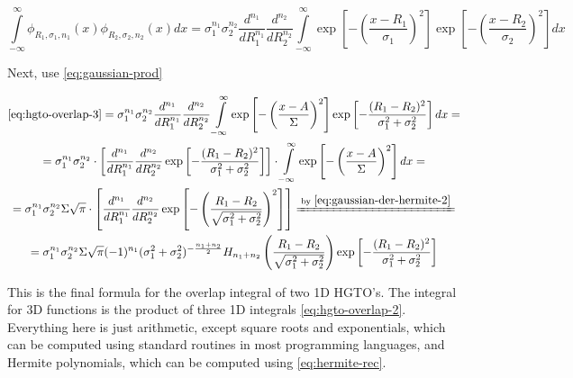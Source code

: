 \documentclass{article}
\newcommand{\equalby}[1]{\xlongequal{\text{by }\eqref{#1}}}
\begin{document}
\begin{appendices}
\begin{equation} \label{eq:hgto-overlap-3}
\int\limits_{-\infty}^\infty \phi_{R_1,\sigma_1,n_1}(x)\phi_{R_2,\sigma_2,n_2}(x) dx =
\sigma_1^{n_1}\sigma_2^{n_2} \frac{d^{n_1}}{dR_1^{n_1}} \frac{d^{n_2}}{dR_2^{n_2}} \int\limits_{-\infty}^\infty \exp\left[-\left(\frac{x-R_1}{\sigma_1}\right)^2\right] \exp\left[-\left(\frac{x-R_2}{\sigma_2}\right)^2\right] dx
\end{equation}

Next, use \eqref{eq:gaussian-prod}

\begin{equation} \label{eq:hgto-overlap}
\begin{gathered}
\eqref{eq:hgto-overlap-3} = \sigma_1^{n_1}\sigma_2^{n_2} \frac{d^{n_1}}{dR_1^{n_1}} \frac{d^{n_2}}{dR_2^{n_2}} \int\limits_{-\infty}^\infty \exp\left[-\left(\frac{x-A}{\Sigma}\right)^2\right]\exp\left[-\frac{(R_1-R_2)^2}{\sigma_1^2 + \sigma_2^2}\right] dx = \\
= \sigma_1^{n_1}\sigma_2^{n_2} \cdot \left[ \frac{d^{n_1}}{dR_1^{n_1}} \frac{d^{n_2}}{dR_2^{n_2}} \exp\left[-\frac{(R_1-R_2)^2}{\sigma_1^2 + \sigma_2^2}\right] \right] \cdot \int\limits_{-\infty}^\infty \exp\left[-\left(\frac{x-A}{\Sigma}\right)^2\right] dx = \\
= \sigma_1^{n_1}\sigma_2^{n_2} \Sigma \sqrt\pi \cdot \left[ \frac{d^{n_1}}{dR_1^{n_1}} \frac{d^{n_2}}{dR_2^{n_2}} \exp\left[-\left(\frac{R_1-R_2}{\sqrt{\sigma_1^2 + \sigma_2^2}}\right)^2\right] \right] \equalby{eq:gaussian-der-hermite-2} \\
= \sigma_1^{n_1}\sigma_2^{n_2} \Sigma \sqrt\pi (-1)^{n_1} (\sigma_1^2+\sigma_2^2)^{-\frac{n_1+n_2}{2}} H_{n_1+n_2}\left(\frac{R_1-R_2}{\sqrt{\sigma_1^2 + \sigma_2^2}}\right) \exp\left[-\frac{(R_1-R_2)^2}{\sigma_1^2 + \sigma_2^2}\right]
\end{gathered}
\end{equation}

This is the final formula for the overlap integral of two 1D HGTO's. The integral for 3D functions is the product of three 1D integrals \eqref{eq:hgto-overlap-2}. Everything here is just arithmetic, except square roots and exponentials, which can be computed using standard routines in most programming languages, and Hermite polynomials, which can be computed using \eqref{eq:hermite-rec}.

\end{appendices}
\end{document}
